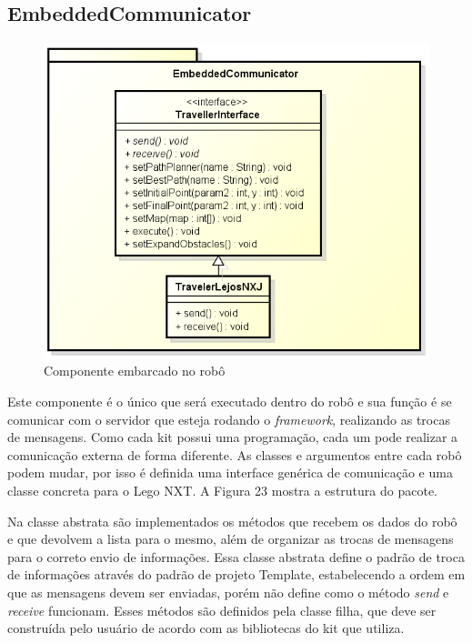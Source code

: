 \subsection{EmbeddedCommunicator}

\begin{figure}[h]
	\centering
	\label{fig23}
		\includegraphics[keepaspectratio=true,scale=0.6]{figuras/embedded.png}
	\caption{Componente embarcado no robô}
\end{figure}

Este componente é o único que será executado dentro do robô e sua função é se comunicar com o servidor que esteja rodando o \textit{framework}, realizando as trocas de mensagens. Como cada kit possui uma programação, cada um pode realizar a comunicação externa de forma diferente. As classes e argumentos entre cada robô podem mudar, por isso é definida uma interface genérica de comunicação e uma classe concreta para o Lego NXT. A Figura 23 mostra a estrutura do pacote.

Na classe abstrata são implementados os métodos que recebem os dados do robô e que devolvem a lista para o mesmo, além de organizar as trocas de mensagens para o correto envio de informações. Essa classe abstrata define o padrão de troca de informações através do padrão de projeto Template, estabelecendo a ordem em que as mensagens devem ser enviadas, porém não define como o método \textit{send} e \textit{receive} funcionam. Esses métodos são definidos pela classe filha, que deve ser construída pelo usuário de acordo com as bibliotecas do kit que utiliza.

